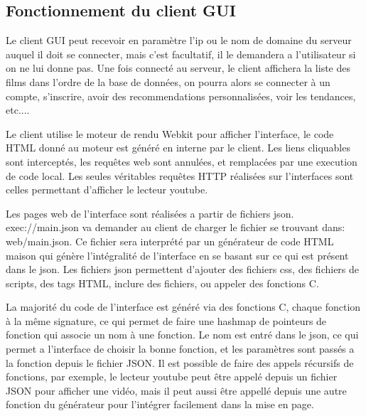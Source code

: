 % 
\subsection{Fonctionnement du client GUI}
Le client GUI peut recevoir en paramètre l'ip ou le nom de domaine du serveur auquel il doit se connecter, mais c'est facultatif, il le demandera a l'utilisateur si on ne lui donne pas. Une fois connecté au serveur, le client affichera la liste des films dans l'ordre de la base de données, on pourra alors se connecter à un compte, s'inscrire, avoir des recommendations personnalisées, voir les tendances, etc....\par
Le client utilise le moteur de rendu Webkit pour afficher l'interface, le code HTML donné au moteur est généré en interne par le client. Les liens cliquables sont interceptés, les requêtes web sont annulées, et remplacées par une execution de code local. Les seules véritables requêtes HTTP réalisées sur l'interfaces sont celles permettant d'afficher le lecteur youtube.\par
Les pages \og web \fg de l'interface sont réalisées a partir de fichiers json. exec://main.json va demander au client de charger le fichier se trouvant dans: web/main.json. Ce fichier sera interprété par un générateur de code HTML maison qui génère l'intégralité de l'interface en se basant sur ce qui est présent dans le json. Les fichiers json permettent d'ajouter des fichiers css, des fichiers de scripts, des tags HTML, inclure des fichiers, ou appeler des fonctions C.\par
La majorité du code de l'interface est généré via des fonctions C, chaque fonction à la même signature, ce qui permet de faire une hashmap de pointeurs de fonction qui associe un nom à une fonction. Le nom est entré dans le json, ce qui permet a l'interface de choisir la bonne fonction, et les paramètres sont passés a la fonction depuis le fichier JSON. Il est possible de faire des appels récursifs de fonctions, par exemple, le lecteur youtube peut être appelé depuis un fichier JSON pour afficher une vidéo, mais il peut aussi être appellé depuis une autre fonction du générateur pour l'intégrer facilement dans la mise en page.\par

